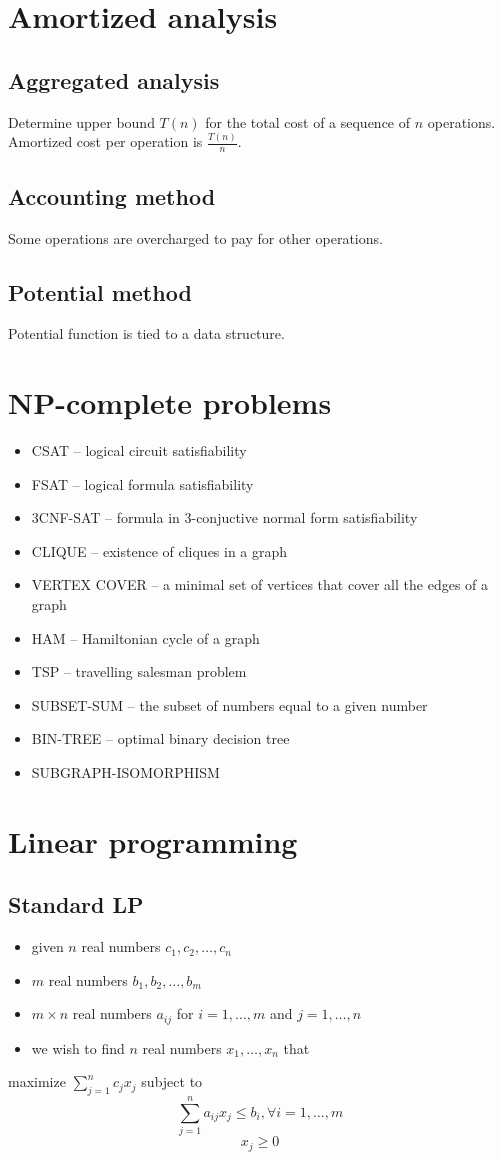 \begin{multicols}{5}
\section{Amortized analysis}
\subsection{Aggregated analysis}
Determine upper bound $T(n)$ for the total cost of a sequence of $n$ operations.
Amortized cost per operation is $\frac{T(n)}{n}$.
\subsection{Accounting method}
Some operations are overcharged to pay for other operations.
\subsection{Potential method}
Potential function is tied to a data structure.
\section{NP-complete problems}
\begin{itemize}
	\item CSAT -- logical circuit satisfiability
	\item FSAT -- logical formula satisfiability
	\item 3CNF-SAT -- formula in 3-conjuctive normal form satisfiability
	\item CLIQUE -- existence of cliques in a graph
	\item VERTEX COVER -- a minimal set of vertices that cover all the edges of a graph
	\item HAM -- Hamiltonian cycle of a graph
	\item TSP -- travelling salesman problem
	\item SUBSET-SUM -- the subset of numbers equal to a given number
	\item BIN-TREE -- optimal binary decision tree
	\item SUBGRAPH-ISOMORPHISM
\end{itemize}
\section{Linear programming}
\subsection{Standard LP}
\begin{itemize}
	\item given $n$ real numbers $c_1,c_2,\ldots,c_n$
	\item $m$ real numbers $b_1,b_2,\ldots,b_m$
	\item $m\times n$ real numbers $a_{ij}$ for $i=1,\ldots,m$ and $j=1,\ldots,n$
	\item we wish to find $n$ real numbers $x_1,\ldots,x_n$ that
\end{itemize}
maximize $\sum_{j=1}^nc_jx_j$ subject to
\[
	\sum_{j=1}^na_{ij}x_j\leq b_i, \forall i=1,\ldots,m
\]
\[x_j\geq 0\]

\end{multicols}
